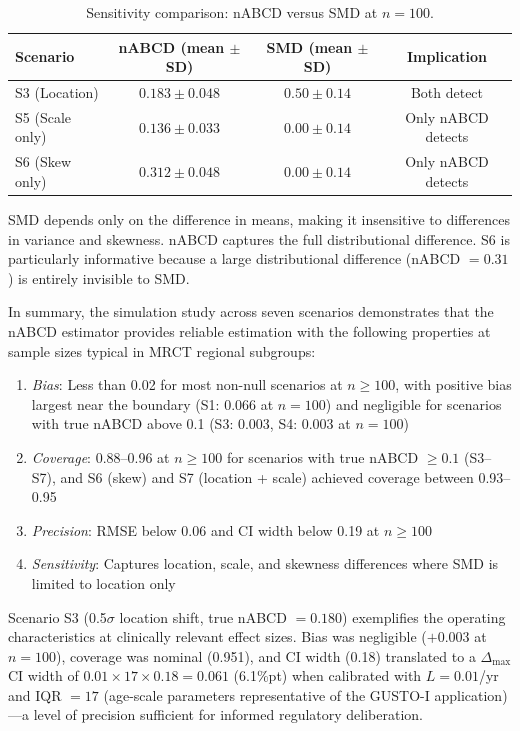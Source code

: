 \documentclass[AMA,Times1COL]{WileyNJDv5}
\begin{document}
\begin{table}[ht]
\centering
\caption{Sensitivity comparison: nABCD versus SMD at $n=100$.\label{tab:smd}}
\begin{tabular}{lccc}
\toprule
\textbf{Scenario} & \textbf{nABCD (mean $\pm$ SD)} & \textbf{SMD (mean $\pm$ SD)} & \textbf{Implication} \\
\midrule
S3 (Location) & $0.183 \pm 0.048$ & $0.50 \pm 0.14$ & Both detect \\
S5 (Scale only) & $0.136 \pm 0.033$ & $0.00 \pm 0.14$ & Only nABCD detects \\
S6 (Skew only) & $0.312 \pm 0.048$ & $0.00 \pm 0.14$ & Only nABCD detects \\
\bottomrule
\end{tabular}
\begin{tablenotes}
\item SMD depends only on the difference in means, making it insensitive to differences in variance and skewness. nABCD captures the full distributional difference. S6 is particularly informative because a large distributional difference (nABCD $= 0.31$) is entirely invisible to SMD.
\end{tablenotes}
\end{table}

In summary, the simulation study across seven scenarios demonstrates that the nABCD estimator provides reliable estimation with the following properties at sample sizes typical in MRCT regional subgroups:
\begin{enumerate}[1.]
\item \emph{Bias}: Less than 0.02 for most non-null scenarios at $n \geq 100$, with positive bias largest near the boundary (S1: 0.066 at $n = 100$) and negligible for scenarios with true nABCD above 0.1 (S3: 0.003, S4: 0.003 at $n = 100$)
\item \emph{Coverage}: 0.88--0.96 at $n \geq 100$ for scenarios with true nABCD $\geq 0.1$ (S3--S7), and S6 (skew) and S7 (location + scale) achieved coverage between 0.93--0.95
\item \emph{Precision}: RMSE below 0.06 and CI width below 0.19 at $n \geq 100$
\item \emph{Sensitivity}: Captures location, scale, and skewness differences where SMD is limited to location only
\end{enumerate}

Scenario S3 (0.5$\sigma$ location shift, true nABCD $= 0.180$) exemplifies the operating characteristics at clinically relevant effect sizes. Bias was negligible ($+0.003$ at $n = 100$), coverage was nominal (0.951), and CI width (0.18) translated to a $\Delta_{\max}$ CI width of $0.01 \times 17 \times 0.18 = 0.061$ (6.1\%pt) when calibrated with $L = 0.01$/yr and IQR $= 17$ (age-scale parameters representative of the GUSTO-I application)---a level of precision sufficient for informed regulatory deliberation.
\end{document}
